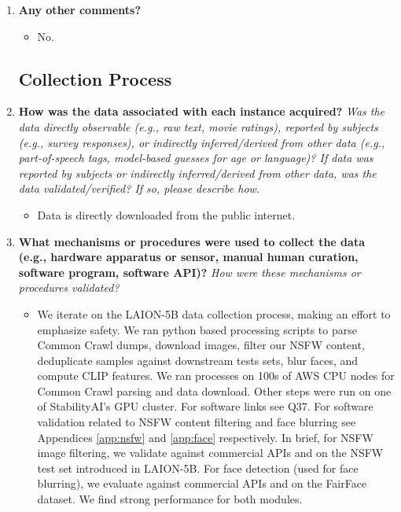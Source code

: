 \begin{enumerate}[label=Q\arabic*]
\item \textbf{Any other comments?}

\begin{itemize}
\item No.
\end{itemize}

\subsection{Collection Process}

\item \textbf{How was the data associated with each instance acquired?} \textit{Was the data directly observable (e.g., raw text, movie ratings), reported by subjects (e.g., survey responses), or indirectly inferred/derived from other data (e.g., part-of-speech tags, model-based guesses for age or language)? If data was reported by subjects or indirectly inferred/derived from other data, was the data validated/verified? If so, please describe how.}

\begin{itemize}
\item Data is directly downloaded from the public internet.
\end{itemize}

\item \textbf{What mechanisms or procedures were used to collect the data (e.g., hardware apparatus or sensor, manual human curation, software program, software API)?} \textit{How were these mechanisms or procedures validated?}

\begin{itemize}
\item We iterate on the LAION-5B data collection process, making an effort to emphasize safety. We ran python based processing scripts to parse Common Crawl dumps, download images, filter our NSFW content, deduplicate samples against downstream tests sets, blur faces, and compute CLIP features. We ran processes on 100s of AWS CPU nodes for Common Crawl parsing and data download. Other steps were run on one of StabilityAI's GPU cluster. For software links see Q37. For software validation related to NSFW content filtering and face blurring see Appendices \ref{app:nsfw} and \ref{app:face} respectively. In brief, for NSFW image filtering, we validate against commercial APIs and on the NSFW test set introduced in LAION-5B. For face detection (used for face blurring), we evaluate against commercial APIs and on the FairFace dataset. We find strong performance for both modules.
\end{itemize}


\end{enumerate}
